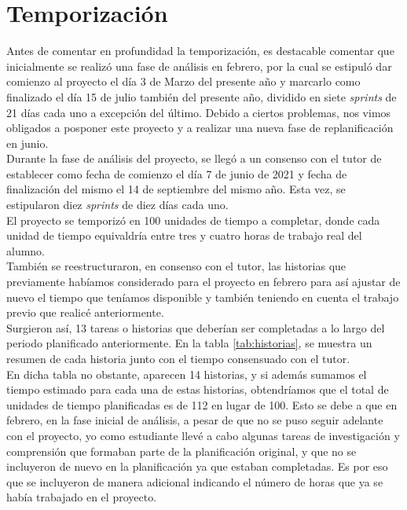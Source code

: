 \section{Temporización}

Antes de comentar en profundidad la temporización, es destacable comentar que inicialmente se realizó una fase de análisis en febrero, por la cual se estipuló dar comienzo al proyecto el día 3 de Marzo del presente año y marcarlo como finalizado el día 15 de julio también del presente año, dividido en siete \textit{sprints} de 21 días cada uno a excepción del último. Debido a ciertos problemas, nos vimos obligados a posponer este proyecto y a realizar una nueva fase de replanificación en junio.\\

Durante la fase de análisis del proyecto, se llegó a un consenso con el tutor de establecer como fecha de comienzo el día 7 de junio de 2021 y fecha de finalización del mismo el 14 de septiembre del mismo año. Esta vez, se estipularon diez \textit{sprints} de diez días cada uno.\\

El proyecto se temporizó en 100 unidades de tiempo a completar, donde cada unidad de tiempo equivaldría entre tres y cuatro horas de trabajo real del alumno.\\

También se reestructuraron, en consenso con el tutor, las historias que previamente habíamos considerado para el proyecto en febrero para así ajustar de nuevo el tiempo que teníamos disponible y también teniendo en cuenta el trabajo previo que realicé anteriormente.\\

Surgieron así, 13 tareas o historias que deberían ser completadas a lo largo del periodo planificado anteriormente. En la tabla \ref{tab:historias}, se muestra un resumen de cada historia junto con el tiempo consensuado con el tutor.\\

En dicha tabla no obstante, aparecen 14 historias, y si además sumamos el tiempo estimado para cada una de estas historias, obtendríamos que el total de unidades de tiempo planificadas es de 112 en lugar de 100. Esto se debe a que en febrero, en la fase inicial de análisis, a pesar de que no se puso seguir adelante con el proyecto, yo como estudiante llevé a cabo algunas tareas de investigación y comprensión que formaban parte de la planificación original, y que no se incluyeron de nuevo en la planificación ya que estaban completadas. Es por eso que se incluyeron de manera adicional indicando el número de horas que ya se había trabajado en el proyecto.

